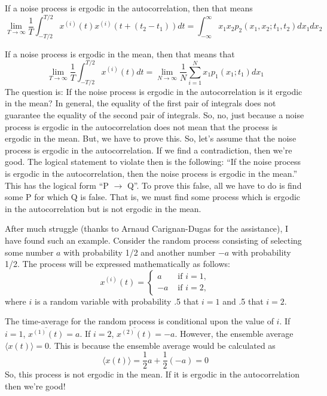 \begin{homeworkProblem}
If a noise process is ergodic in the autocorrelation, then that means
\[
   \lim_{T \to \infty} \frac{1}{T} \int_{-T/2}^{T/2} x^{(i)}(t)x^{(i)}(t+
   (t_{2}-t_{1})) dt =
   \int_{-\infty}^{\infty}x_{1}x_{2}p_{2}(x_{1},x_{2}; t_{1},t_{2})
   dx_{1}dx_{2}
\]

If a noise process is ergodic in the mean, then that means that \[ \lim_{T \to
\infty} \frac{1}{T} \int_{-T/2}^{T/2} x^{(i)}(t) dt = \lim_{N \to \infty}
\frac{1}{N} \sum^{N}_{i=1} x_{1}p_{1}(x_{1}; t_{1}) dx_{1} \] The question is:
If the noise process is ergodic in the autocorrelation is it ergodic in the
mean? In general, the equality of the first pair of integrals does not guarantee
the equality of the second pair of integrals. So, no, just because a noise
process is ergodic in the autocorrelation does not mean that the process is
ergodic in the mean. But, we have to prove this. So, let's assume that the noise
process is ergodic in the autocorrelation. If we find a contradiction, then
we're good.  The logical statement to violate then is the following: ``If the
noise process is ergodic in the autocorrelation, then the noise process is
ergodic in the mean.'' This has the logical form ``P $ \to $ Q''. To prove this
false, all we have to do is find some P for which Q is false. That is, we must
find some process which is ergodic in the autocorrelation but is not ergodic in
the mean.

After much struggle (thanks to Arnaud Carignan-Dugas for the assistance), I have
found such an example. Consider the random process consisting of selecting some
number $ a $ with probability 1/2 and another number $ -a $ with probability
1/2. The process will be expressed mathematically as follows:
\[
   x^{(i)}(t) = \begin{cases}
      a &\text{ if } i = 1, \\
      -a &\text{ if } i = 2,
   \end{cases}
   \]
   where $ i $ is a random variable with probability .5 that $ i=1 $ and
   .5 that $ i=2 $.

The time-average for the random process is conditional upon the value of $ i $.
If $ i = 1 $, $ \overline{x^{(1)}(t)} = a $. If $ i = 2 $, $
\overline{x^{(2)}(t)} = -a $. However, the ensemble average $ \langle x(t)
\rangle = 0 $. This is because the ensemble average would be calculated as
\[
   \langle x(t) \rangle = \frac{1}{2}a + \frac{1}{2}(-a) = 0
\]
So, this process is not ergodic in the mean. If it is ergodic in the
autocorrelation then we're good!


\end{homeworkProblem}
